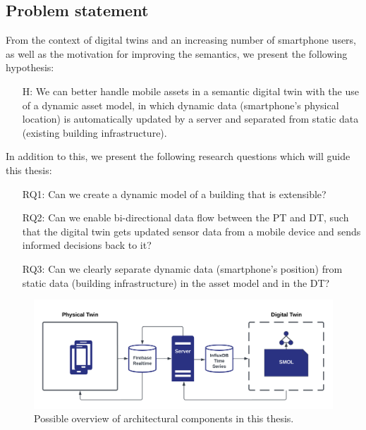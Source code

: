 \documentclass{article}
\begin{document}
\subsection{Problem statement}
From the context of digital twins and an increasing number of smartphone users, as well as the motivation for improving the semantics, we present the following hypothesis:

\begin{itemize}
    \item[H:] We can better handle mobile assets in a semantic digital twin with the use of a dynamic asset model, in which dynamic data (smartphone's physical location) is automatically updated by a server and separated from static data (existing building infrastructure).
\end{itemize}


In addition to this, we present the following research questions which will guide this thesis:
\begin{itemize}
    \item[RQ1:] Can we create a dynamic model of a building that is extensible?
    \item [RQ2:] Can we enable bi-directional data flow between the PT and DT, such that the digital twin gets updated sensor data from a mobile device and sends informed decisions back to it?
    \item [RQ3:] Can we clearly separate dynamic data (smartphone's position) from static data (building infrastructure) in the asset model and in the DT?
\end{itemize}

\begin{figure}[!h]
    \centering
    \includegraphics[scale=0.12]{graphics/thesis_overview.png}
    \caption{Possible overview of architectural components in this thesis.}
    \label{fig:components}
\end{figure}
\end{document}

